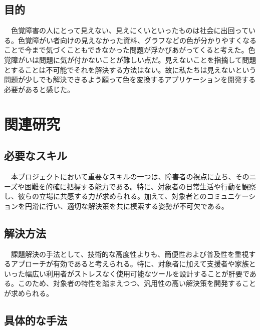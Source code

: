 \section{目的}
　色覚障害の人にとって見えない、見えにくいといったものは社会に出回っている。色覚障がい者向けの見えなかった資料、グラフなどの色が分かりやすくなることで今まで気づくこともできなかった問題が浮かびあがってくると考えた。色覚障がいは問題に気が付かないことが難しい点だ。見えないことを指摘して問題とすることは不可能でそれを解決する方法はない。故に私たちは見えないという問題が少しでも解決できるよう願って色を変換するアプリケーションを開発する必要があると感じた。

\chapter{関連研究}
\section{必要なスキル}
　本プロジェクトにおいて重要なスキルの一つは、障害者の視点に立ち、そのニーズや困難を的確に把握する能力である。特に、対象者の日常生活や行動を観察し、彼らの立場に共感する力が求められる。加えて、対象者とのコミュニケーションを円滑に行い、適切な解決策を共に模索する姿勢が不可欠である。

\section{解決方法}
　課題解決の手法として、技術的な高度性よりも、簡便性および普及性を重視するアプローチが有効であると考えられる。特に、対象者に加えて支援者や家族といった幅広い利用者がストレスなく使用可能なツールを設計することが肝要である。このため、対象者の特性を踏まえつつ、汎用性の高い解決策を開発することが求められる。\\
\section{具体的な手法}

